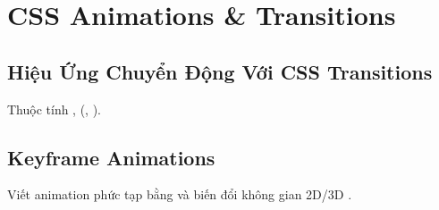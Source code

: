 \chapter{CSS Animations \& Transitions}
\label{chap:animations_transitions}

\section{Hiệu Ứng Chuyển Động Với CSS Transitions}
Thuộc tính ,  (, ).

\section{Keyframe Animations}
Viết animation phức tạp bằng  và biến đổi không gian 2D/3D .
